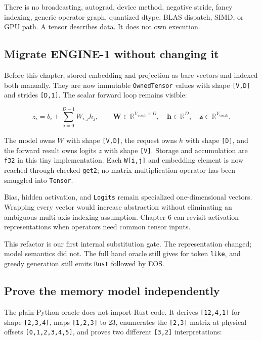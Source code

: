 \documentclass[
  10pt,
]{article}
\begin{document}
There is no broadcasting, autograd, device method, negative stride,
fancy indexing, generic operator graph, quantized dtype, BLAS dispatch,
SIMD, or GPU path. A tensor describes data. It does not own execution.

\subsection{Migrate ENGINE-1 without changing
it}\label{migrate-engine-1-without-changing-it}

Before this chapter, \texttt{} stored
embedding and projection as bare vectors and indexed both manually. They
are now immutable \texttt{OwnedTensor} values with shape
\texttt{{[}V,D{]}} and strides \texttt{{[}D,1{]}}. The scalar forward
loop remains visible:

\[
z_i=b_i+\sum_{j=0}^{D-1}W_{i,j}h_j,
\qquad
\mathbf{W}\in\mathbb{R}^{V_{\mathrm{vocab}}\times D},
\quad \mathbf{h}\in\mathbb{R}^{D},
\quad \mathbf{z}\in\mathbb{R}^{V_{\mathrm{vocab}}}.
\]

The model owns \(W\) with shape \texttt{{[}V,D{]}}, the request owns
\(h\) with shape \texttt{{[}D{]}}, and the forward result owns logits
\(z\) with shape \texttt{{[}V{]}}. Storage and accumulation are
\texttt{f32} in this tiny implementation. Each \texttt{W{[}i,j{]}} and
embedding element is now reached through checked \texttt{get2}; no
matrix multiplication operator has been smuggled into \texttt{Tensor}.

Bias, hidden activation, and \texttt{Logits} remain specialized
one-dimensional vectors. Wrapping every vector would increase
abstraction without eliminating an ambiguous multi-axis indexing
assumption. Chapter 6 can revisit activation representations when
operators need common tensor inputs.

This refactor is our first internal substitution gate. The
representation changed; model semantics did not. The full hand oracle
still gives \texttt{\seqsplit{[-0.7,0.1,0.4,2.2]}} for token
\texttt{like}, and greedy generation still emits \texttt{Rust} followed
by EOS.

\subsection{Prove the memory model
independently}\label{prove-the-memory-model-independently}

The plain-Python oracle does not import Rust code. It derives
\texttt{{[}12,4,1{]}} for shape \texttt{{[}2,3,4{]}}, maps
\texttt{{[}1,2,3{]}} to 23, enumerates the \texttt{{[}2,3{]}} matrix at
physical offsets \texttt{{[}0,1,2,3,4,5{]}}, and proves two different
\texttt{{[}3,2{]}} interpretations:
\end{document}
